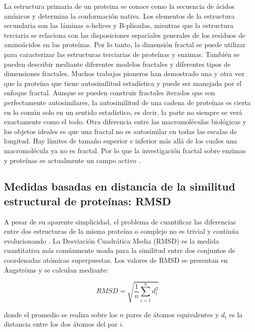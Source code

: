 \documentclass[11pt]{article}
\begin{document}
La estructura primaria de un proteina se conoce como la secuencia de \'{a}cidos am\'{i}nicos y determina la conformaci\'{o}n nativa. Los elementos de la estructura secundaria son las l\'{a}minas a-helices y B-plisadas, mientras que la estructura terciaria se relaciona con las disposiciones espaciales generales de los residuos de amino\'{a}cidos en las prote\'{i}nas. Por lo tanto, la dimensi\'{o}n fractal se puede utilizar para caracterizar las estructuras terciarias de prote\'{i}nas y enzimas. Tambi\'{e}n se pueden describir mediante diferentes modelos fractales y diferentes tipos de dimensiones fractales. Muchos trabajos pioneros han demostrado una y otra vez que la prote\'{i}na que tiene autosimilitud estad\'{i}stica y puede ser manejada por el enfoque fractal. Aunque se pueden construir fractales iterados que son perfectamente autosimilares, la autosimilitud de una cadena de prote\'{i}nas es cierta en lo com\'{u}n solo en un sentido estad\'{i}stico, es decir, la parte no siempre se ver\'{a} exactamente como el todo. Otra diferencia entre las macromol\'{e}culas biol\'{o}gicas y los objetos ideales es que una fractal no es autosimilar en todas las escalas de longitud. Hay l\'{i}mites de tamaño superior e inferior m\'{a}s all\'{a} de los cuales una macromol\'{e}cula ya no es fractal. Por lo que la investigaci\'{o}n fractal sobre enzimas y prote\'{i}nas es actualmente un campo activo \cite{Mustafa1996}. 



\subsection{Medidas basadas en distancia de la similitud estructural de prote\'{i}nas: RMSD}

A pesar de su aparente simplicidad, el problema de cuantificar las diferencias entre dos estructuras de la misma proteína o complejo no es trivial y continúa evolucionando \cite{Kufareva2012}. La Desviaci\'{o}n Cuadr\'{a}tica Media (RMSD) es la medida cuantitativa m\'{a}s com\'{u}nmente usada para la similitud entre dos conjuntos de coordenadas at\'{o}micas superpuestas. Los valores de RMSD se presentan en Ångströms y se calculan mediante:

\begin{equation}
RMSD = \sqrt{\frac{1}{n} \sum_{i=1}^{n} d_i^2}
\end{equation}

donde el promedio se realiza sobre los \(n\) pares de \'{a}tomos equivalentes y \(d_i\) es la distancia entre los dos \'{a}tomos del par \(i\). 
\end{document}
